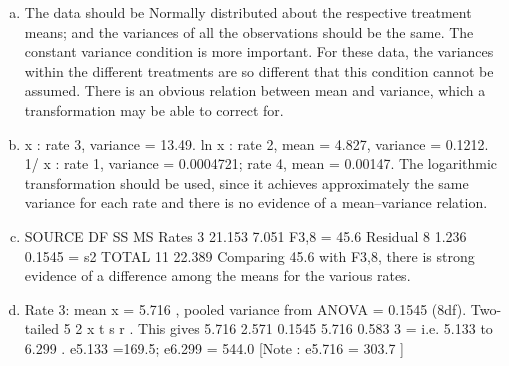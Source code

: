 \documentclass[a4paper,12pt]{article}
\begin{document}
\begin{enumerate}[(a)]
\item The data should be Normally distributed about the respective treatment means;
and the variances of all the observations should be the same. The constant variance
condition is more important. For these data, the variances within the different
treatments are so different that this condition cannot be assumed. There is an obvious
relation between mean and variance, which a transformation may be able to correct
for.
\item  x : rate 3, variance = 13.49.
ln x : rate 2, mean = 4.827, variance = 0.1212.
1/ x : rate 1, variance = 0.0004721;
rate 4, mean = 0.00147.
The logarithmic transformation should be used, since it achieves approximately the
same variance for each rate and there is no evidence of a mean–variance relation.
\item 
SOURCE DF SS MS
Rates 3 21.153 7.051 F3,8 = 45.6
Residual 8 1.236 0.1545 = s2
TOTAL 11 22.389
Comparing 45.6 with F3,8, there is strong evidence of a difference among the means
for the various rates.
\item Rate 3: mean x = 5.716 , pooled variance from ANOVA = 0.1545 (8df).
Two-tailed 5%
2
x t s
r
\pm  .
This gives 5.716 2.571 0.1545 5.716 0.583
3
\pm  = \pm  i.e. 5.133 to 6.299 .
e5.133 =169.5; e6.299 = 544.0 [Note : e5.716 = 303.7 ]

\end{enumerate}
\end{document}
